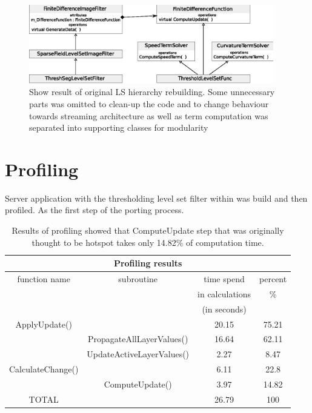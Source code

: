 \begin{figure}
    \centering
    \includegraphics[width=0.95\textwidth]{data/resultingFilter}
    \caption[Resulting level set filter ready to be ported to Cell/B.E.]
    {
Show result of original LS hierarchy rebuilding.
Some unnecessary parts was omitted to clean-up the code and to change behaviour towards streaming architecture as well as term computation was separated into supporting classes for modularity
    }
    \label{fg:resultingFilter}
\end{figure}

\section{Profiling}

Server application with the thresholding level set filter within was build and then profiled. As the first step of the porting process.

\begin{table}
\centering
\begin{tabular}{|c|c|c|c|}
\hline
\multicolumn{4}{|c|}{Profiling results}\\
\hline
function name&subroutine&time spend&percent\\&&in calculations&\%\\&&(in seconds)&\\
\hline
\hline
ApplyUpdate()	&				&	20.15&	75.21\\
\hline
		&PropagateAllLayerValues()	&	16.64&	62.11\\
\hline
		&UpdateActiveLayerValues()	&	2.27&	8.47\\
\hline
CalculateChange()&				&	6.11&	22.8\\
\hline
		&ComputeUpdate()		&	3.97&	14.82\\
\hline
TOTAL		&				&	26.79&	100\\
\hline
\end{tabular}
\par
\caption[Profiling results]
{
  Results of profiling showed that ComputeUpdate step that was originally thought to be hotspot takes only 14.82\% of computation time.
}
\label{tab:profilingresults}
\end{table}

